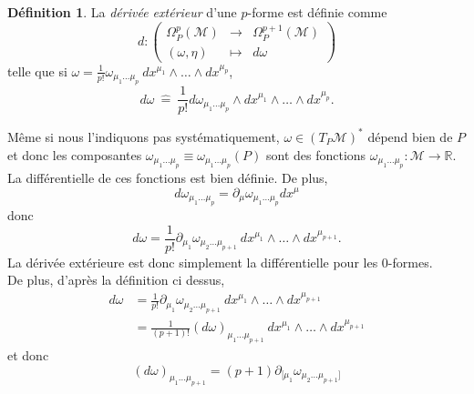 \documentclass[a4paper,11pt]{report}
\theoremstyle{definition}
\theoremstyle{plain}
\theoremstyle{definition}
\newtheorem{defn}{Définition}[chapter]
\theoremstyle{remark}
\newcommand{\M}{\mathscr{M}}
\newcommand{\p}{\partial}
\begin{document}
            \begin{defn}
                La \textit{dérivée extérieur} d'une $p$-forme est définie comme
                \begin{equation}
                d:\left(
                \begin{array}{ccc}
                    \Omega_P^p(\M) & \longrightarrow & \Omega_P^{p+1}(\M) \\
                    (\omega,\eta) & \longmapsto & d\omega
                \end{array}
                \right)
                \end{equation}
                telle que si $\omega = \frac{1}{p!}\omega_{\mu_1\dots\mu_p}~dx^{\mu_1}\wedge \dots\wedge dx^{\mu_p}$,
                \begin{equation}
                    d\omega ~\hat{=}~ \frac{1}{p!} d\omega_{\mu_1\dots\mu_p}\wedge dx^{\mu_1}\wedge \dots\wedge dx^{\mu_p}.
                \end{equation}
            \end{defn}
            
            Même si nous l'indiquons pas systématiquement, $\omega\in (T_P\M)^*$ dépend bien de $P$ et donc les composantes $\omega_{\mu_1\dots\mu_p}\equiv \omega_{\mu_1\dots\mu_p}(P)$ sont des fonctions $\omega_{\mu_1\dots\mu_p}:\M\to\mathbb{R}$. La différentielle de ces fonctions est bien définie. De plus, 
            \begin{equation}
                d\omega_{\mu_1\dots\mu_p} = \p_\mu \omega_{\mu_1\dots\mu_p}dx^\mu
            \end{equation}
            donc
            \begin{equation}
                d\omega = \frac{1}{p!} \p_{\mu_1}\omega_{\mu_2\dots\mu_{p+1}}~dx^{\mu_1}\wedge \dots\wedge dx^{\mu_{p+1}}.
            \end{equation}
            La dérivée extérieure est donc simplement la différentielle pour les $0$-formes.\\
            
            De plus, d'après la définition ci dessus,
            \begin{align}
                d\omega &= \frac{1}{p!} \p_{\mu_1}\omega_{\mu_2\dots\mu_{p+1}}~dx^{\mu_1}\wedge \dots\wedge dx^{\mu_{p+1}}\\
                &= \frac{1}{(p+1)!}(d\omega)_{\mu_1 \dots\mu_{p+1}}~dx^{\mu_1}\wedge \dots\wedge dx^{\mu_{p+1}}
            \end{align}
            et donc
            \begin{equation}
                (d\omega)_{\mu_1 \dots\mu_{p+1}} = (p+1) \p_{[\mu_1}\omega_{\mu_2\dots\mu_{p+1}]}
            \end{equation}
            
\end{document}
